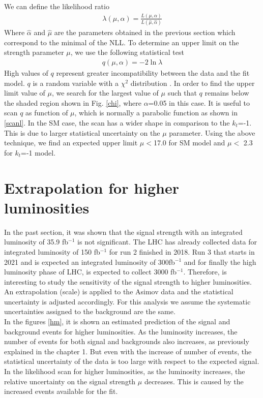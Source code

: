	We can define the likelihood ratio
	\begin{align}
		\lambda(\mu,\alpha)=\frac{L(\mu,\alpha)}{L(\hat{\mu},\hat{\alpha})}
	\end{align}
	Where $\hat{\alpha}$ and $\hat{\mu}$ are the parameters obtained in the previous section which correspond to the minimal of the NLL.
	To determine an upper limit on the strength parameter $\mu$, we use the following statistical test
	\begin{align}
		q(\mu,\alpha)= -2\ln{\lambda} 
	\end{align}
	High values of $q$ represent greater incompatibility between the data and the fit model.
	$q$ is a random variable with a $\chi^2$ distribution \cite{asimov}.
	In order to find the upper limit value of $\mu$, we search for the largest value of $\mu$ such that $q$ remains below the shaded region shown in Fig. \ref{chi}, where $\alpha$=0.05 in this case. 
	It is useful to scan $q$ as function of $\mu$, which is normally a parabolic function as shown in \ref{scanl}. In the SM case, the scan has a wider shape in comparison to the $k_t$=-1. This is due to larger statistical uncertainty on the $\mu$ parameter. 
	Using the above technique, we find an expected upper limit $\mu < $17.0 for SM model and $\mu < $ 2.3 for $k_t$=-1 model. 
	
	
	
	
	\section{Extrapolation for higher luminosities}
	In the past section, it was shown that the signal strength with an integrated luminosity of 35.9 fb$^{-1}$ is not significant. The LHC has already collected data for integrated luminosity of 150 fb$^{-1}$ for run 2 finished in 2018. Run 3 that starts in 2021 and is expected an integrated luminosity of 300fb$^{-1}$ and for finally the high luminosity phase of LHC, is expected to collect 3000 fb$^{-1}$. Therefore, is interesting to study the sensitivity of the signal strength to higher luminosities. 
	An extrapolation (scale) is applied to the Asimov data and the statistical uncertainty is adjusted accordingly. For this analysis we assume the systematic uncertainties assigned to the background are the same.
	\\
	
	In the figures \ref{hm}, it is shown an estimated prediction of the signal and background events for higher luminosities. As the luminosity increases, the number of events for both signal and backgrounds also increases, as previously explained in the chapter 1. But even with the increase of number of events, the statistical uncertainty of the data is too large with respect to the expected signal. In the likelihood scan for higher luminosities, as the luminosity increases, the relative uncertainty on the signal strength $\mu$ decreases. This is caused by the increased events available for the fit. \\
	

